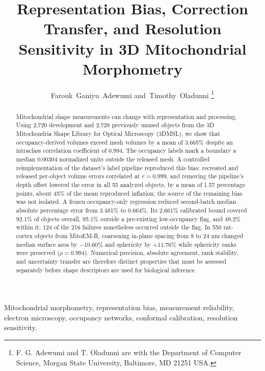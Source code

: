 \documentclass[journal]{IEEEtran}
\begin{document}
\title{Representation Bias, Correction Transfer, and Resolution Sensitivity in 3D Mitochondrial Morphometry}
\author{Farouk~Ganiyu~Adewumi and~Timothy~Oladunni%
\thanks{F. G. Adewumi and T. Oladunni are with the Department of Computer Science, Morgan State University, Baltimore, MD 21251 USA.}}
\maketitle

\begin{abstract}
Mitochondrial shape measurements can change with representation and processing. Using 2,720 development and 2,728 previously unused objects from the 3D Mitochondria Shape Library for Optical Microscopy (3DMSL), we show that occupancy-derived volumes exceed mesh volumes by a mean of 3.665\% despite an intraclass correlation coefficient of 0.994. The occupancy labels mark a boundary a median 0.00304 normalized units outside the released mesh. A controlled reimplementation of the dataset's label pipeline reproduced this bias: recreated and released per-object volume errors correlated at $r=0.999$, and removing the pipeline's depth offset lowered the error in all 55 analyzed objects, by a mean of 1.57 percentage points, about 45\% of the mean reproduced inflation; the source of the remaining bias was not isolated. A frozen occupancy-only regression reduced second-batch median absolute percentage error from 3.481\% to 0.664\%. Its 2.661\% calibrated bound covered 92.1\% of objects overall, 95.1\% outside a pre-existing low-occupancy flag, and 49.2\% within it; 124 of the 216 failures nonetheless occurred outside the flag. In 550 rat-cortex objects from MitoEM-R, coarsening in-plane spacing from 8 to 24 nm changed median surface area by $-10.60$\% and sphericity by $+11.76$\% while sphericity ranks were preserved ($\rho=0.994$). Numerical precision, absolute agreement, rank stability, and uncertainty transfer are therefore distinct properties that must be assessed separately before shape descriptors are used for biological inference.
\end{abstract}

\begin{IEEEkeywords}
Mitochondrial morphometry, representation bias, measurement reliability, electron microscopy, occupancy networks, conformal calibration, resolution sensitivity.
\end{IEEEkeywords}
\end{document}
